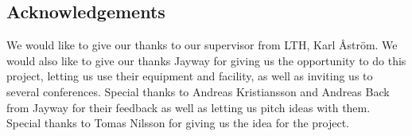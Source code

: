 \begin{center}

\section*{Acknowledgements}

\end{center}
We would like to give our thanks to our supervisor from LTH, Karl Åström. We would also like to give our thanks Jayway for giving us the opportunity to do this project, letting us use their equipment and facility, as well as inviting us to several conferences. Special thanks to Andreas Kristiansson and Andreas Back from Jayway for their feedback as well as letting us pitch ideas with them. Special thanks to Tomas Nilsson for giving us the idea for the project.

\newpage
